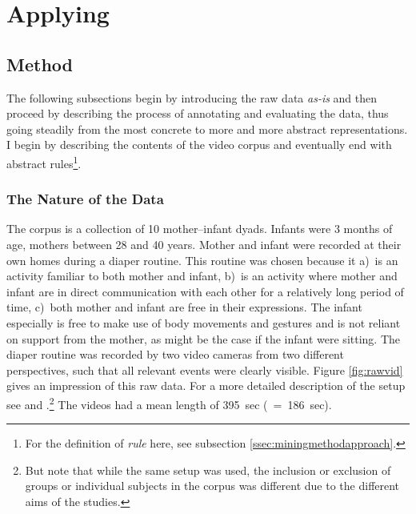 
\chapter{Applying \fpmupper}
\label{ch:fpm}

\section{Method}
\label{sec:fpmmet}
The following subsections begin by introducing the raw data \emph{as-is} and then proceed by describing the process of annotating and evaluating the data, thus going steadily from the most concrete to more and more abstract representations.
I begin by describing the contents of the video corpus and eventually end with abstract rules\footnote{For the definition of \emph{rule} here, see subsection \ref{ssec:miningmethodapproach}.}.

\subsection{The Nature of the Data}
\label{ssec:fpmmetnat}
The corpus is a collection of 10 mother--infant dyads.
Infants were 3 months of age, mothers between 28 and 40 years.
Mother and infant were recorded at their own homes during a diaper routine.
This routine was chosen because it a)~is an activity familiar to both mother and infant, b)~is an activity where mother and infant are in direct communication with each other for a relatively long period of time, c)~both mother and infant are free in their expressions.
The infant especially is free to make use of body movements and gestures and is not reliant on support from the mother, as might be the case if the infant were sitting.
The diaper routine was recorded by two video cameras from two different perspectives, such that all relevant events were clearly visible.
Figure \ref{fig:rawvid} gives an impression of this raw data.
For a more detailed description of the setup see \citet[]{nomikou_verbs_2017} and \citet[]{nomikou_language_2011}.\footnote{But note that while the same setup was used, the inclusion or exclusion of groups or individual subjects in the corpus was different due to the different aims of the studies.} The videos had a mean length of 395~sec (\sd~=~186~sec).


